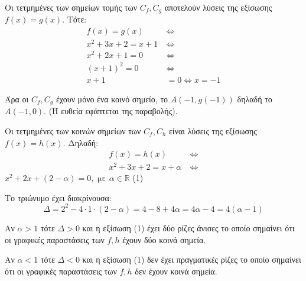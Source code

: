 
\begin{alist}
\item Οι τετμημένες των σημείων τομής των $C_f, C_g$ αποτελούν λύσεις της εξίσωσης $f(x) = g(x)$. Τότε:
\begin{align*}
f(x) = g(x) \ &\Leftrightarrow \\
x^2 + 3x + 2 = x + 1 \ &\Leftrightarrow \\
x^2 + 2x + 1 = 0 \ &\Leftrightarrow \\
(x + 1)^2 = 0 \ &\Leftrightarrow \\
x + 1 &= 0 \Leftrightarrow x = -1
\end{align*}

Άρα οι $C_f, C_g$ έχουν μόνο ένα κοινό σημείο, το $A(-1, g(-1))$ δηλαδή το $A(-1, 0)$. (Η ευθεία εφάπτεται της παραβολής).

\item Οι τετμημένες των κοινών σημείων των $C_f, C_h$ είναι λύσεις της εξίσωσης $f(x) = h(x)$. Δηλαδή:
\begin{align*}
f(x) = h(x) \ &\Leftrightarrow \\
x^2 + 3x + 2 = x + \alpha \ &\Leftrightarrow
\end{align*}
$x^2 + 2x + (2 - \alpha) = 0, \text{ με } \alpha \in \mathbb{R}$ (1)

Το τριώνυμο έχει διακρίνουσα:
\[\Delta = 2^2 - 4 \cdot 1 \cdot (2 - \alpha) = 4 - 8 + 4\alpha = 4\alpha - 4 = 4(\alpha - 1)\]

\begin{rlist}
\item Αν $\alpha > 1$ τότε $\Delta > 0$ και η εξίσωση (1) έχει δύο ρίζες άνισες το οποίο σημαίνει ότι οι γραφικές παραστάσεις των $f, h$ έχουν δύο κοινά σημεία.
\item Αν $\alpha < 1$ τότε $\Delta < 0$ και η εξίσωση (1) δεν έχει πραγματικές ρίζες το οποίο σημαίνει ότι οι γραφικές παραστάσεις των $f, h$ δεν έχουν κοινά σημεία.
\end{rlist}
\end{alist}

